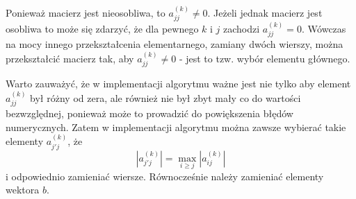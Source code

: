 \documentclass{article}
\begin{document}
Ponieważ macierz jest nieosobliwa, to $a^{(k)}_{jj} \neq 0$. Jeżeli jednak macierz jest osobliwa to może się zdarzyć, że dla pewnego $k$ i $j$ zachodzi $a^{(k)}_{jj} = 0$. 
Wówczas na mocy innego przekształcenia elementarnego, zamiany dwóch wierszy, można przekształcić macierz tak, aby $a^{(k)}_{jj} \neq 0$ - jest to tzw. wybór elementu głównego.

Warto zauważyć, że w implementacji algorytmu ważne jest nie tylko aby element $a^{(k)}_{jj}$ był różny od zera, ale również nie był zbyt mały co do wartości bezwzględnej, ponieważ może to prowadzić do powiększenia błędów numerycznych.
Zatem w implementacji algorytmu można zawsze wybierać takie elementy $a^{(k)}_{j'j}$, że
$$|a^{(k)}_{j'j}| = \max_{i \geq j} |a^{(k)}_{ij}|$$ i odpowiednio zamieniać wiersze. Równocześnie należy zamieniać elementy wektora $b$.
\end{document}
